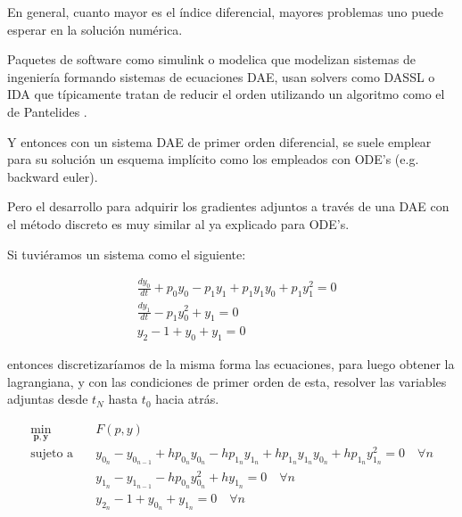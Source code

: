 En general, cuanto mayor es el índice diferencial, mayores problemas uno puede
esperar en la solución numérica.

Paquetes de software como simulink o modelica que modelizan sistemas de
ingeniería formando sistemas de ecuaciones DAE, usan solvers como DASSL
\cite{petzold1982description} o IDA \cite{hindmarsh2005sundials} que
típicamente tratan de reducir el orden utilizando un algoritmo como el de
Pantelides \cite{pantelides1988consistent}.

Y entonces con un sistema DAE de primer orden diferencial, se suele emplear
para su solución un esquema implícito como los empleados con ODE's (e.g.
backward euler).

Pero el desarrollo para adquirir los gradientes adjuntos a través de una DAE
con el método discreto es muy similar al ya explicado para ODE's.

Si tuviéramos un sistema como el siguiente:

\begin{align}
	 & \frac{dy_0}{dt} + p_0 y_0 - p_1 y_1 + p_1 y_1 y_0 + p_1 y_1^2 = 0 \\
	 & \frac{dy_1}{dt} - p_1 y_0^2 + y_1 = 0                             \\
	 & y_2 - 1 + y_0 + y_1 = 0
\end{align}

entonces discretizaríamos de la misma forma las ecuaciones, para luego obtener
la lagrangiana, y con las condiciones de primer orden de esta, resolver las
variables adjuntas desde $t_N$ hasta $t_0$ hacia atrás.

\begin{align}
	\min_{\mathbf{p}, \mathbf{y}} \quad & F(p, y)                                                                                                                                      \\
	\text{sujeto a} \quad               & y_{0_n} - y_{0_{n-1}} + h  p_{0_n}  y_{0_n} - h  p_{1_n}  y_{1_n} + h  p_{1_n}  y_{1_n}  y_{0_n} + h  p_{1_n}  y_{1_n}^2 = 0 \quad \forall n \\
	                                    & y_{1_n} - y_{1_{n-1}} - h  p_{0_n}  y_{0_n}^2 + h  y_{1_n} = 0 \quad \forall n                                                               \\
	                                    & y_{2_n} - 1 + y_{0_n} + y_{1_n} = 0 \quad \forall n
\end{align}


